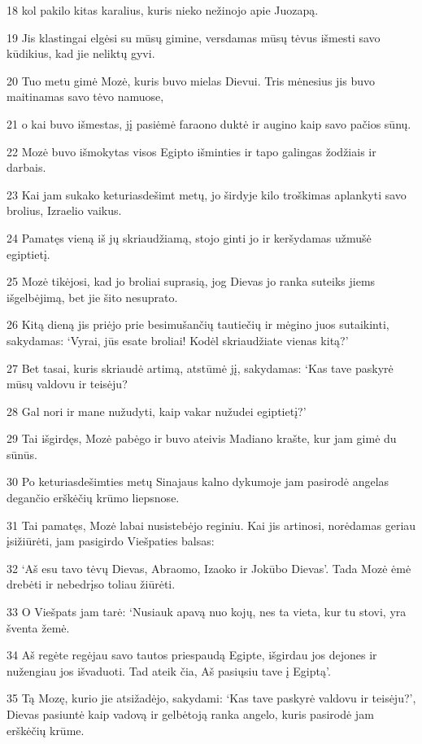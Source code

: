 \par 18 kol pakilo kitas karalius, kuris nieko nežinojo apie Juozapą. 
\par 19 Jis klastingai elgėsi su mūsų gimine, versdamas mūsų tėvus išmesti savo kūdikius, kad jie neliktų gyvi. 
\par 20 Tuo metu gimė Mozė, kuris buvo mielas Dievui. Tris mėnesius jis buvo maitinamas savo tėvo namuose, 
\par 21 o kai buvo išmestas, jį pasiėmė faraono duktė ir augino kaip savo pačios sūnų. 
\par 22 Mozė buvo išmokytas visos Egipto išminties ir tapo galingas žodžiais ir darbais. 
\par 23 Kai jam sukako keturiasdešimt metų, jo širdyje kilo troškimas aplankyti savo brolius, Izraelio vaikus. 
\par 24 Pamatęs vieną iš jų skriaudžiamą, stojo ginti jo ir keršydamas užmušė egiptietį. 
\par 25 Mozė tikėjosi, kad jo broliai suprasią, jog Dievas jo ranka suteiks jiems išgelbėjimą, bet jie šito nesuprato. 
\par 26 Kitą dieną jis priėjo prie besimušančių tautiečių ir mėgino juos sutaikinti, sakydamas: ‘Vyrai, jūs esate broliai! Kodėl skriaudžiate vienas kitą?’ 
\par 27 Bet tasai, kuris skriaudė artimą, atstūmė jį, sakydamas: ‘Kas tave paskyrė mūsų valdovu ir teisėju? 
\par 28 Gal nori ir mane nužudyti, kaip vakar nužudei egiptietį?’ 
\par 29 Tai išgirdęs, Mozė pabėgo ir buvo ateivis Madiano krašte, kur jam gimė du sūnūs. 
\par 30 Po keturiasdešimties metų Sinajaus kalno dykumoje jam pasirodė angelas degančio erškėčių krūmo liepsnose. 
\par 31 Tai pamatęs, Mozė labai nusistebėjo reginiu. Kai jis artinosi, norėdamas geriau įsižiūrėti, jam pasigirdo Viešpaties balsas: 
\par 32 ‘Aš esu tavo tėvų Dievas, Abraomo, Izaoko ir Jokūbo Dievas’. Tada Mozė ėmė drebėti ir nebedrįso toliau žiūrėti. 
\par 33 O Viešpats jam tarė: ‘Nusiauk apavą nuo kojų, nes ta vieta, kur tu stovi, yra šventa žemė. 
\par 34 Aš regėte regėjau savo tautos priespaudą Egipte, išgirdau jos dejones ir nužengiau jos išvaduoti. Tad ateik čia, Aš pasiųsiu tave į Egiptą’. 
\par 35 Tą Mozę, kurio jie atsižadėjo, sakydami: ‘Kas tave paskyrė valdovu ir teisėju?’, Dievas pasiuntė kaip vadovą ir gelbėtoją ranka angelo, kuris pasirodė jam erškėčių krūme. 
